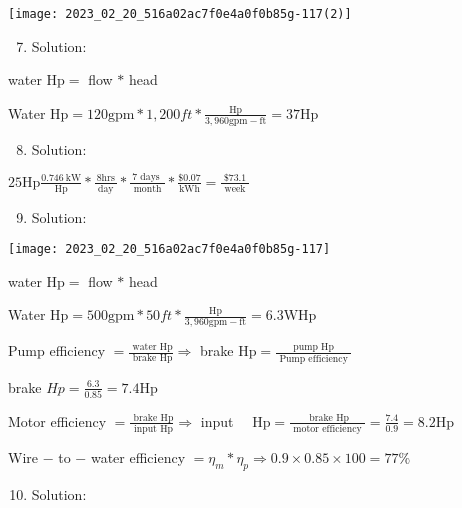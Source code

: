 \documentclass[10pt]{article}
\begin{document}
\begin{enumerate}
\begin{enumerate}
\begin{center}
\texttt{[image: 2023\_02\_20\_516a02ac7f0e4a0f0b85g-117(2)]}
\end{center}

\begin{enumerate}
  \setcounter{enumi}{6}
  \item Solution:
\end{enumerate}

water $\mathrm{Hp}=$ flow $*$ head

Water $\mathrm{Hp}=120 \mathrm{gpm} * 1,200 f t * \frac{\mathrm{Hp}}{3,960 \mathrm{gpm}-\mathrm{ft}}=37 \mathrm{Hp}$

\begin{enumerate}
  \setcounter{enumi}{7}
  \item Solution:
\end{enumerate}

$25 \mathrm{Hp} \frac{0.746 \mathrm{~kW}}{\mathrm{Hp}} * \frac{8 \mathrm{hrs}}{\text { day }} * \frac{7 \text { days }}{\text { month }} * \frac{\$ 0.07}{\mathrm{kWh}}=\frac{\$ 73.1}{\text { week }}$

\begin{enumerate}
  \setcounter{enumi}{8}
  \item Solution:
\end{enumerate}

\begin{center}
\texttt{[image: 2023\_02\_20\_516a02ac7f0e4a0f0b85g-117]}
\end{center}

water $\mathrm{Hp}=$ flow $*$ head

Water $\mathrm{Hp}=500 \mathrm{gpm} * 50 f t * \frac{\mathrm{Hp}}{3,960 \mathrm{gpm}-\mathrm{ft}}=6.3 \mathrm{WHp}$

Pump efficiency $=\frac{\text { water } \mathrm{Hp}}{\text { brake } \mathrm{Hp}} \Longrightarrow$ brake $\mathrm{Hp}=\frac{\text { pump Hp }}{\text { Pump efficiency }}$

brake $H p=\frac{6.3}{0.85}=7.4 \mathrm{Hp}$

Motor efficiency $=\frac{\text { brake } \mathrm{Hp}}{\text { input } \mathrm{Hp}} \Longrightarrow$ input $\quad \mathrm{Hp}=\frac{\text { brake } \mathrm{Hp}}{\text { motor efficiency }}=\frac{7.4}{0.9}=8.2 \mathrm{Hp}$

Wire $-$ to $-$ water efficiency $=\eta_{m} * \eta_{p} \Longrightarrow 0.9 \times 0.85 \times 100=77 \%$

\begin{enumerate}
  \setcounter{enumi}{9}
  \item Solution:
\end{enumerate}


\end{enumerate}
\end{enumerate}
\end{document}
